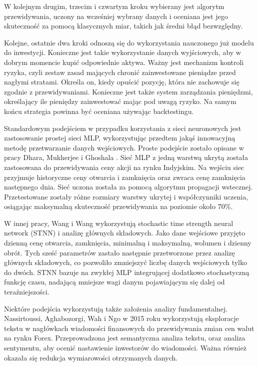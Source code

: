 \documentclass[twoside]{iisthesis}
\begin{document}
W kolejnym drugim, trzecim i czwartym kroku wybierany jest algorytm przewidywania, uczony na wcześniej wybrany danych i oceniana jest jego skuteczność za pomocą klasycznych miar, takich jak średni błąd bezwzględny.

Kolejne, ostatnie dwa kroki odnoszą się do wykorzystania nauczonego już modelu do inwestycji. Konieczne jest takie wykorzystanie danych wyjściowych, aby w dobrym momencie kupić odpowiednie aktywa. Ważny jest mechanizm kontroli ryzyka, czyli zestaw zasad mających chronić zainwestowane pieniądze przed nagłymi stratami. Określa on, kiedy opuścić pozycję, która nie zachowuje się zgodnie z przewidywaniami. Konieczne jest także system zarządzania pieniędzmi, określający ile pieniędzy zainwestować mając pod uwagą ryzyko. Na samym końcu strategia powinna być oceniana używając backtestingu. 

Standardowym podejściem w przypadku korzystania z sieci neuronowych jest zastosowanie prostej sieci MLP, wykorzystując przedtem jakąś innowacyjną metodę przetwarzanie danych wejściowych. Proste podejście zostało opisane w pracy Dhara, Mukherjee i Ghoshala \cite{5738795}. Sieć MLP z jedną warstwą ukrytą została zastosowana do przewidywania ceny akcji na rynku Indyjskim. Na wejściu siec przyjmuje historyczne ceny otwarcia i zamknięcia oraz zwraca cenę zamknięcia następnego dnia. Sieć uczona została za pomocą algorytmu propagacji wstecznej. Przetestowane zostały różne rozmiary warstwy ukrytej i współczynniki uczenia, osiągając maksymalną skuteczność przewidywania na poziomie około 70\%. 

W innej pracy, Wang i Wang wykorzystują stochastic time strength neural network (STNN) i analizę głównych składowych. Jako dane wejściowe przyjęto dzienną cenę otwarcia, zamknięcia, minimalną i maksymalną, wolumen i dzienny obrót. Tych sześć parametrów zastało następnie przetworzone przez analizę głównych składowych, co pozwoliło zmniejszyć liczbę danych wejściowych tylko do dwóch. STNN bazuje na zwykłej MLP integrującej dodatkowo stochastyczną funkcję czasu, nadającą mniejsze wagi danym pojawiającym się dalej od teraźniejszości.

Niektóre podejścia wykorzystują także założenia analizy fundamentalnej. Nassirtoussi, Aghabozorgi, Wah i Ngo w 2015 roku \cite{KhadjehNassirtoussi2015306} wykorzystują eksploracje tekstu w nagłówkach wiadomości finansowych do przewidywania zmian cen walut na rynku Forex. Przeprowadzona jest semantyczna analiza tekstu, oraz analiza sentymentu, aby ocenić nastawienie inwestorów do wiadomości. Ważna również okazała się redukcja wymiarowości otrzymanych danych.
\end{document}
